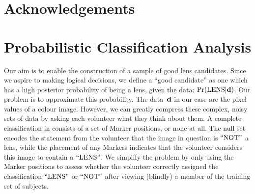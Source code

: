 \documentclass[useAMS,usenatbib,a4paper]{mn2e}
\begin{document}

\section*{Acknowledgements}




\appendix


\section{Probabilistic Classification Analysis}
\label{appendix:swap}

Our aim is to enable the construction of a sample of good lens candidates.
Since we aspire to making logical  decisions, we define a  ``good candidate''
as one which has a high posterior probability of being a lens, given the data:
${\rm Pr}({\rm LENS}|{\mathbf{d}})$. Our problem is to approximate this probability. The data~${\mathbf{d}}$
in our case are the pixel values of a colour image. However, we can greatly
compress these complex, noisy sets of data by asking each volunteer what they
think about them. A complete  classification in \SW consists of a set of
Marker positions, or none at all. The null set encodes the statement from
the volunteer that the image in question is ${\rm ``NOT"}$ a lens, while the
placement of any  Markers indicates that the volunteer considers this image to
contain a ${\rm ``LENS"}$.  We simplify the problem by only using the Marker
positions to assess whether the volunteer  correctly assigned the
classification ${\rm ``LENS"}$ or ${\rm ``NOT"}$ after viewing (blindly) a member of
the training set of subjects.
\end{document}

